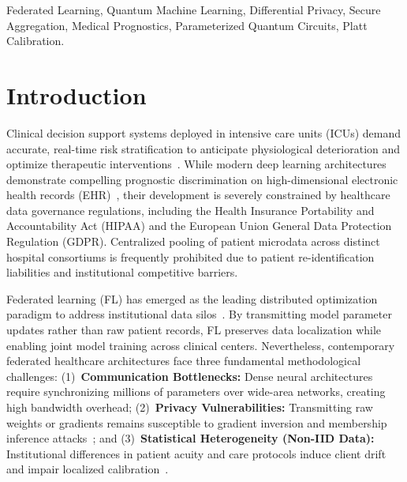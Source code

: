 \documentclass[conference]{IEEEtran}
\begin{document}
\begin{abstract}
parameter-efficient representations for privacy-preserving clinical prognostication without observed predictive impairment.
\end{abstract}

\begin{IEEEkeywords}
Federated Learning, Quantum Machine Learning, Differential Privacy, Secure Aggregation, Medical Prognostics, Parameterized Quantum Circuits, Platt Calibration.
\end{IEEEkeywords}

\section{Introduction}
Clinical decision support systems deployed in intensive care units (ICUs) demand accurate, real-time risk stratification to anticipate physiological deterioration and optimize therapeutic interventions~\cite{rajkomar2018scalable,harutyunyan2019multitask}. While modern deep learning architectures demonstrate compelling prognostic discrimination on high-dimensional electronic health records (EHR)~\cite{johnson2016mimic,pollard2018eicu}, their development is severely constrained by healthcare data governance regulations, including the Health Insurance Portability and Accountability Act (HIPAA) and the European Union General Data Protection Regulation (GDPR). Centralized pooling of patient microdata across distinct hospital consortiums is frequently prohibited due to patient re-identification liabilities and institutional competitive barriers.

Federated learning (FL) has emerged as the leading distributed optimization paradigm to address institutional data silos~\cite{mcmahan2017communication,kairouz2021advances}. By transmitting model parameter updates rather than raw patient records, FL preserves data localization while enabling joint model training across clinical centers. Nevertheless, contemporary federated healthcare architectures face three fundamental methodological challenges: (1)~\textbf{Communication Bottlenecks:} Dense neural architectures require synchronizing millions of parameters over wide-area networks, creating high bandwidth overhead; (2)~\textbf{Privacy Vulnerabilities:} Transmitting raw weights or gradients remains susceptible to gradient inversion and membership inference attacks~\cite{abadi2016deep,bonawitz2017practical}; and (3)~\textbf{Statistical Heterogeneity (Non-IID Data):} Institutional differences in patient acuity and care protocols induce client drift and impair localized calibration~\cite{li2020federated,vancalster2016calibration}.
\end{document}
